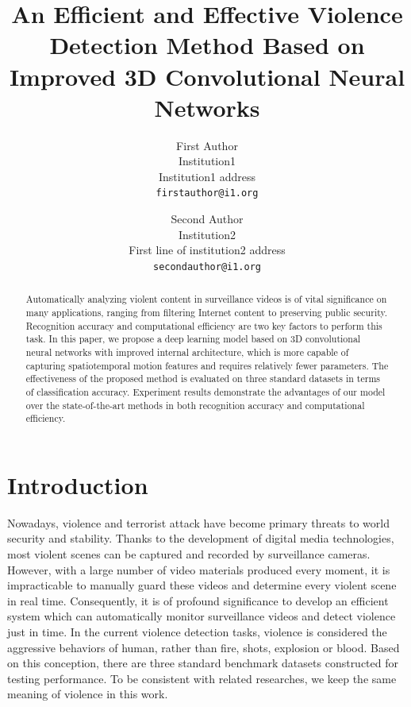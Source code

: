 \documentclass[10pt,twocolumn,letterpaper]{article}
\begin{document}
\title{An Efficient and Effective Violence Detection Method Based on Improved 3D Convolutional Neural Networks}

\author{First Author\\
Institution1\\
Institution1 address\\
{\tt\small firstauthor@i1.org}
\and
Second Author\\
Institution2\\
First line of institution2 address\\
{\tt\small secondauthor@i1.org}
}

\maketitle

\begin{abstract}
Automatically analyzing violent content in surveillance videos is of vital significance on many applications, ranging from filtering Internet content to preserving public security. Recognition accuracy and computational efficiency are two key factors to perform this task. In this paper, we propose a deep learning model based on 3D convolutional neural networks  with improved internal architecture, which is more capable of capturing spatiotemporal motion features and requires relatively fewer parameters. The effectiveness of the proposed method is evaluated on three standard datasets in terms of classification accuracy. Experiment results demonstrate the advantages of our model over the state-of-the-art methods in both recognition accuracy and computational efficiency. 
\end{abstract}

\section{Introduction} \label{sec:1}

Nowadays, violence and terrorist attack have become primary threats to world security and stability.
Thanks to the development of digital media technologies, most violent scenes can be captured and recorded by surveillance cameras.
However, with a large number of video materials produced every moment, it is impracticable to manually guard these videos and determine every violent scene in real time.
Consequently, it is of profound significance to develop an efficient system which can automatically monitor surveillance videos and detect violence just in time.
In the current violence detection tasks, violence is considered the aggressive behaviors of human, rather than fire, shots, explosion or blood.
Based on this conception, there are three standard benchmark datasets constructed for testing performance.
To be consistent with related researches, we keep the same meaning of violence in this work.
\end{document}
